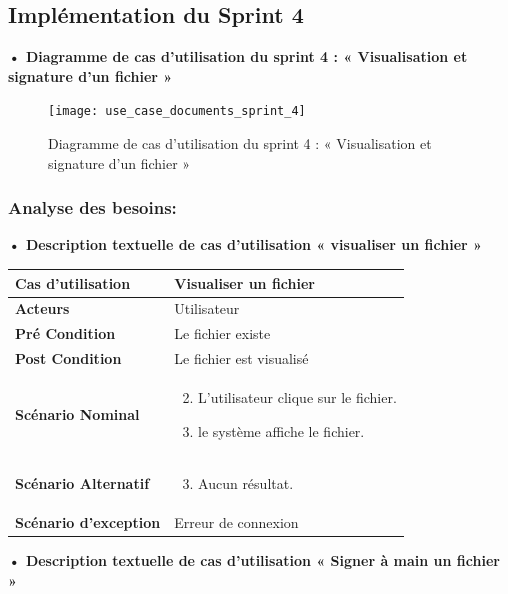 \subsection{Implémentation du Sprint 4}
\textbf{•	Diagramme de cas d'utilisation du sprint 4 : « Visualisation et signature d'un fichier »}

\begin{figure}[H]
  \centering
  \texttt{[image: use\_case\_documents\_sprint\_4]}
  \caption{Diagramme de cas d'utilisation du sprint 4 : « Visualisation et signature d'un fichier »}
  \label{fig:UseCaseDiagram}
\end{figure}

\subsubsection{Analyse des besoins:}
\textbf{•	Description textuelle de cas d'utilisation « visualiser un fichier  »}

\begin{longtable}{|p{5cm}|p{10cm}|}
\hline
\textbf{Cas d'utilisation}&Visualiser un fichier\\
\hline
\textbf{Acteurs}&Utilisateur\\
\hline
\textbf{Pré Condition}&Le fichier existe\\
\hline
\textbf{Post Condition}&Le fichier est visualisé\\
\hline
\textbf{Scénario Nominal}&
\vspace{-\baselineskip}
\begin{enumerate}
    \setcounter{enumi}{1}
  \item L'utilisateur clique sur le fichier.
  \item le système affiche le fichier.
\end{enumerate}\\
\hline
\textbf{Scénario Alternatif}&
\vspace{-\baselineskip}
\begin{enumerate}
    \setcounter{enumi}{2}
    \item Aucun résultat.
\end{enumerate}\\
\hline
\textbf{Scénario d'exception}&Erreur de connexion\\
\hline
\end{longtable}

\textbf{•	Description textuelle de cas d'utilisation « Signer à main un fichier »}


